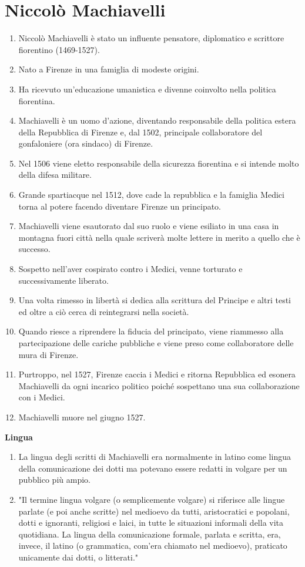 \documentclass{article}
\begin{document}
\newpage
\section{Niccolò Machiavelli}

\begin{enumerate}
    \item Niccolò Machiavelli è stato un influente pensatore, diplomatico e scrittore fiorentino (1469-1527).
    \item Nato a Firenze in una famiglia di modeste origini.
    \item Ha ricevuto un'educazione umanistica e divenne coinvolto nella politica fiorentina.
    \item Machiavelli è un uomo d'azione, diventando responsabile della politica estera della Repubblica di Firenze e, dal 1502, principale collaboratore del gonfaloniere (ora sindaco) di Firenze.
    \item Nel 1506 viene eletto responsabile della sicurezza fiorentina e si intende molto della difesa militare.
    \item Grande spartiacque nel 1512, dove cade la repubblica e la famiglia Medici torna al potere facendo diventare Firenze un principato.
    \item Machiavelli viene esautorato dal suo ruolo e viene esiliato in una casa in montagna fuori città nella quale scriverà molte lettere in merito a quello che è successo.
    \item Sospetto nell'aver cospirato contro i Medici, venne torturato e successivamente liberato.
    \item Una volta rimesso in libertà si dedica alla scrittura del Principe e altri testi ed oltre a ciò cerca di reintegrarsi nella società.
    \item Quando riesce a riprendere la fiducia del principato, viene riammesso alla partecipazione delle cariche pubbliche e viene preso come collaboratore delle mura di Firenze.
    \item Purtroppo, nel 1527, Firenze caccia i Medici e ritorna Repubblica ed esonera Machiavelli da ogni incarico politico poiché sospettano una sua collaborazione con i Medici.
    \item Machiavelli muore nel giugno 1527.
\end{enumerate}

\textbf{Lingua}
\begin{enumerate}
    \item La lingua degli scritti di Machiavelli era normalmente in latino come lingua della comunicazione dei dotti ma potevano essere redatti in volgare per un pubblico più ampio.
    \item "Il termine lingua volgare (o semplicemente volgare) si riferisce alle lingue parlate (e poi anche scritte) nel medioevo da tutti, aristocratici e popolani, dotti e ignoranti, religiosi e laici, in tutte le situazioni informali della vita quotidiana. La lingua della comunicazione formale, parlata e scritta, era, invece, il latino (o grammatica, com’era chiamato nel medioevo), praticato unicamente dai dotti, o litterati."
\end{enumerate}
\end{document}
